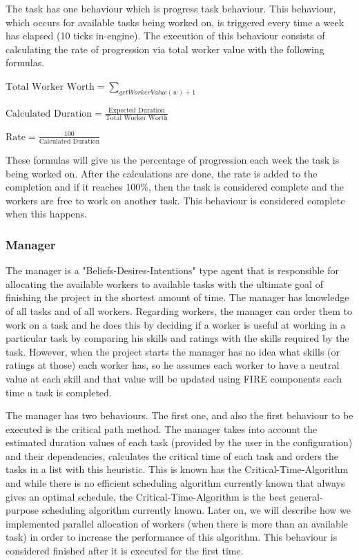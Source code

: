 \documentclass[paper=a4, fontsize=11pt]{scrartcl} %
\numberwithin{equation}{section} %
\numberwithin{figure}{section} %
\numberwithin{table}{section} %
\begin{document}
The task has one behaviour which is progress task behaviour. This behaviour, which occurs for available tasks being worked on, is triggered every time a week has elapsed (10 ticks in-engine). The execution of this behaviour consists of calculating the rate of progression via total worker value with the following formulas.
\begin{center}
	$\text{Total Worker Worth} = \sum\nolimits_{getWorkerValue(w) + 1}$
\end{center}
\begin{center}
	$\text{Calculated Duration} = \frac{\text{Expected Duration}}{\text{Total Worker Worth}}$
\end{center}
\begin{center}
		$\text{Rate} = \frac
		{100}
		{\text{Calculated Duration}}$
\end{center}
These formulas will give us the percentage of progression each week the task is being worked on.
After the calculations are done, the rate is added to the completion and if it reaches 100\%, then the task is considered complete and the workers are free to work on another task. This behaviour is considered complete when this happens.
\subsubsection{Manager}
The manager is a "Beliefs-Desires-Intentions" type agent that is responsible for allocating the available workers to available tasks with the ultimate goal of finishing the project in the shortest amount of time. The manager has knowledge of all tasks and of all workers. Regarding workers, the manager can order them to work on a task and he does this by deciding if a worker is useful at working in a particular task by comparing his skills and ratings with the skills required by the task. However, when the project starts the manager has no idea what skills (or ratings at those) each worker has, so he assumes each worker to have a neutral value at each skill and that value will be updated using FIRE components each time a task is completed.

The manager has two behaviours. The first one, and also the first behaviour to be executed is the critical path method. The manager takes into account the estimated duration values of each task (provided by the user in the configuration) and their dependencies, calculates the critical time of each task and orders the tasks in a list with this heuristic. This is known has the Critical-Time-Algorithm and while there is no efficient scheduling algorithm currently known that always gives an optimal schedule, the Critical-Time-Algorithm is the best general-purpose scheduling algorithm currently known. Later on, we will describe how we implemented parallel allocation of workers (when there is more than an available task) in order to increase the performance of this algorithm. This behaviour is considered finished after it is executed for the first time.
\end{document}

